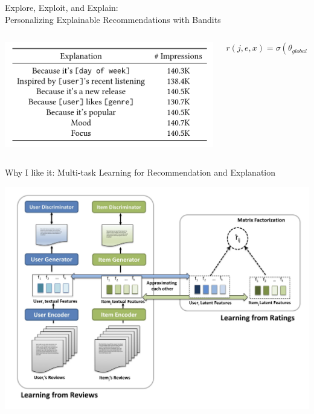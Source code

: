 \documentclass[11pt,aspectratio=169,handout]{beamer}
\begin{document}
\begin{frame}{Explore, Exploit, and Explain: \\ Personalizing Explainable Recommendations with Bandits \cite{EX3}}

\begin{columns}
\begin{column}{0.4\textwidth}
\begin{center}
\includegraphics[scale=0.4]{images/spotify.png}
\end{center}
\end{column}

\begin{column}{0.5\textwidth}
\[
r(j, e, x) = \sigma(\theta_{global} + \theta_{j} \times 1_j + \theta_e \times 1_e + \theta_x \times 1_x)
\]
\end{column}
\end{columns}

\end{frame}

\begin{frame}{Why I like it: Multi-task Learning for Recommendation and Explanation \cite{GAN}}

\begin{center}
\includegraphics[scale=0.4]{images/gan.png}
\end{center}

\end{frame}
\end{document}
